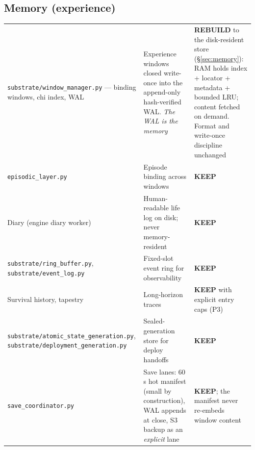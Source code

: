 \documentclass[11pt]{article}
\newcommand{\keep}{\textbf{KEEP}}
\newcommand{\rebuild}{\textbf{REBUILD}}
\begin{document}
\subsection{Memory (experience)}
\begin{longtable}{p{} p{} p{}}
\toprule
\texttt{substrate/window\_manager.py} — binding windows, chi index, WAL &
Experience windows closed write-once into the append-only hash-verified
WAL. \emph{The WAL is the memory} &
\rebuild{} to the disk-resident store (\S\ref{sec:memory}): RAM holds
index + locator + metadata + bounded LRU; content fetched on demand.
Format and write-once discipline unchanged \\
\texttt{episodic\_layer.py} &
Episode binding across windows &
\keep{} \\
Diary (engine diary worker) &
Human-readable life log on disk; never memory-resident &
\keep{} \\
\texttt{substrate/ring\_buffer.py}, \texttt{substrate/event\_log.py} &
Fixed-slot event ring for observability &
\keep{} \\
Survival history, tapestry &
Long-horizon traces &
\keep{} with explicit entry caps (P3) \\
\texttt{substrate/atomic\_state\_generation.py},
\texttt{substrate/deployment\_generation.py} &
Sealed-generation store for deploy handoffs &
\keep{} \\
\texttt{save\_coordinator.py} &
Save lanes: 60\,s hot manifest (small by construction), WAL appends at
close, S3 backup as an \emph{explicit} lane &
\keep{}; the manifest never re-embeds window content \\
\bottomrule
\end{longtable}
\end{document}
